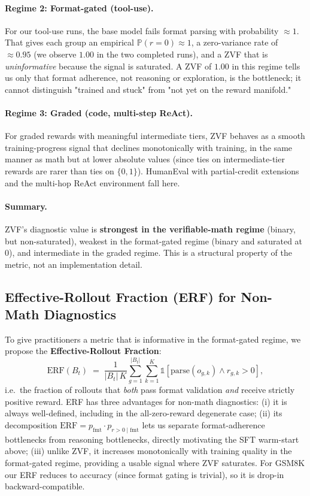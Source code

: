 \paragraph{Regime 2: Format-gated (tool-use).} For our tool-use runs,
the base model fails format parsing with probability $\approx 1$. That
gives each group an empirical $\mathbb{P}(r=0) \approx 1$, a
zero-variance rate of $\approx 0.95$ (we observe $1.00$ in the two
completed runs), and a ZVF that is \emph{uninformative} because the
signal is saturated. A ZVF of $1.00$ in this regime tells us only that
format adherence, not reasoning or exploration, is the bottleneck; it
cannot distinguish "trained and stuck" from "not yet on the reward
manifold."

\paragraph{Regime 3: Graded (code, multi-step ReAct).} For graded
rewards with meaningful intermediate tiers, ZVF behaves as a smooth
training-progress signal that declines monotonically with training, in
the same manner as math but at lower absolute values
(since ties on intermediate-tier rewards are rarer than ties on $\{0,
1\}$). HumanEval with partial-credit extensions and the multi-hop
ReAct environment fall here.

\paragraph{Summary.} ZVF's diagnostic value is \textbf{strongest in the
verifiable-math regime} (binary, but non-saturated), weakest in the
format-gated regime (binary and saturated at $0$), and intermediate in
the graded regime. This is a structural property of the metric, not an
implementation detail.

\subsection{Effective-Rollout Fraction (ERF) for Non-Math Diagnostics}
\label{subsec:erf}

To give practitioners a metric that is informative in the format-gated
regime, we propose the \textbf{Effective-Rollout Fraction}:
\begin{equation}
\label{eq:erf}
\mathrm{ERF}(B_t) \;=\; \frac{1}{|B_t|\,K}\sum_{g=1}^{|B_t|}\sum_{k=1}^{K}
  \mathbb{1}\!\left[\mathrm{parse}(o_{g,k}) \wedge r_{g,k} > 0\right],
\end{equation}
i.e.\ the fraction of rollouts that \emph{both} pass format validation
\emph{and} receive strictly positive reward. ERF has three advantages
for non-math diagnostics: (i) it is always well-defined, including in
the all-zero-reward degenerate case; (ii) its decomposition
$\mathrm{ERF} = p_{\text{fmt}} \cdot p_{r>0 \mid \text{fmt}}$ lets us
separate format-adherence bottlenecks from reasoning bottlenecks,
directly motivating the SFT warm-start above; (iii) unlike ZVF, it
increases monotonically with training quality in the format-gated
regime, providing a usable signal where ZVF saturates. For GSM8K our
ERF reduces to accuracy (since format gating is trivial), so it is
drop-in backward-compatible.


